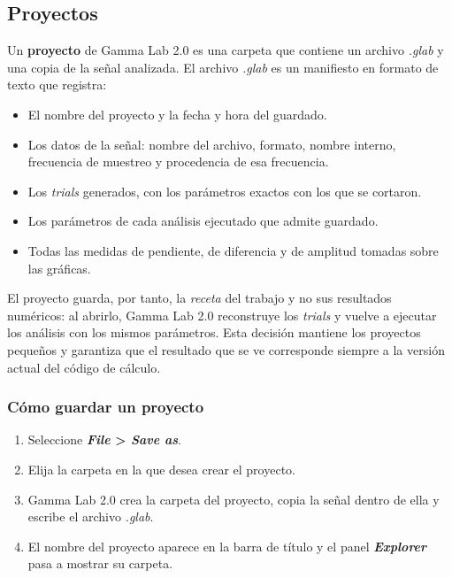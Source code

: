 \documentclass[11pt,a4paper]{article}
\begin{document}
    \subsection{Proyectos}
    Un \textbf{proyecto} de Gamma Lab 2.0 es una carpeta que contiene un archivo \textit{.glab} y una copia de la se\~nal analizada. El archivo \textit{.glab} es un manifiesto en formato de texto que registra:

    \begin{itemize}
        \item El nombre del proyecto y la fecha y hora del guardado.
        \item Los datos de la se\~nal: nombre del archivo, formato, nombre interno, frecuencia de muestreo y procedencia de esa frecuencia.
        \item Los \textit{trials} generados, con los par\'ametros exactos con los que se cortaron.
        \item Los par\'ametros de cada an\'alisis ejecutado que admite guardado.
        \item Todas las medidas de pendiente, de diferencia y de amplitud tomadas sobre las gr\'aficas.
    \end{itemize}

    El proyecto guarda, por tanto, la \emph{receta} del trabajo y no sus resultados num\'ericos: al abrirlo, Gamma Lab 2.0 reconstruye los \textit{trials} y vuelve a ejecutar los an\'alisis con los mismos par\'ametros. Esta decisi\'on mantiene los proyectos peque\~nos y garantiza que el resultado que se ve corresponde siempre a la versi\'on actual del c\'odigo de c\'alculo.

    \subsubsection*{C\'omo guardar un proyecto}
    \begin{enumerate}
        \item Seleccione \textbf{\textit{File} > \textit{Save as}}.
        \item Elija la carpeta en la que desea crear el proyecto.
        \item Gamma Lab 2.0 crea la carpeta del proyecto, copia la se\~nal dentro de ella y escribe el archivo \textit{.glab}.
        \item El nombre del proyecto aparece en la barra de t\'itulo y el panel \textbf{\textit{Explorer}} pasa a mostrar su carpeta.
    \end{enumerate}
\end{document}

